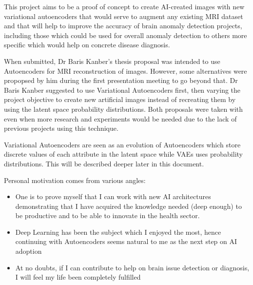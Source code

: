 This project aims to be a proof of concept to create AI-created images with new variational autoencoders that would serve to augment any existing MRI dataset and that will help to improve the accuracy of brain anomaly detection projects, including those which could be used for overall anomaly detection to others more specific which would help on concrete disease diagnosis.

When submitted, Dr Baris Kanber's thesis proposal was intended to use Autoencoders for MRI reconstruction of images. However, some alternatives were propopsed by him during the first presentation meeting to go beyond that. Dr Baris Kanber suggested to use Variational Autoencoders first, then varying the project objective to create new artificial images instead of recreating them by using the latent space probability distributions. Both proposals were taken with even when more research and experiments would be needed due to the lack of previous projects using this technique.

Variational Autoencoders are seen as an evolution of Autoencoders which store discrete values of each attribute in the latent space while VAEs uses probability distributions. This will be described deeper later in this document. 

Personal motivation comes from various angles:

\begin{itemize}
    \item One is to prove myself that I can work with new AI architectures demonstrating that I have acquired the knowledge needed (deep enough) to be productive and to be able to innovate in the health sector.
    \item Deep Learning has been the subject which I enjoyed the most, hence continuing with Autoencoders seems natural to me as the next step on AI adoption
    \item At no doubts, if I can contribute to help on brain issue detection or diagnosis, I will feel my life been completely fulfilled
\end{itemize}